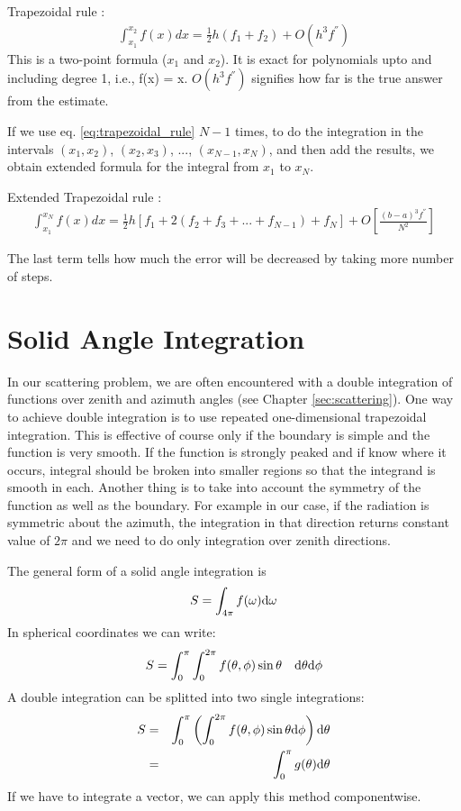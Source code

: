 Trapezoidal rule : 
\begin{eqnarray}
\label{eq:trapezoidal_rule}
{\int_{x_1}^{x_2} f(x)dx}  = \frac{1}{2} h (f_1 + f_2) + O(h^3 f^{''})
\end{eqnarray}
This is a two-point formula ($x_1$ and $x_2$).  It is exact for
polynomials upto and including degree 1, i.e., f(x) = x. $O(h^3
f^{''})$ signifies how far is the true answer from the estimate. 

If we use eq. \ref{eq:trapezoidal_rule} $N - 1$ times, to do the
integration in the intervals $(x_1, x_2)$,  $(x_2, x_3)$, ...,
$(x_{N-1}, x_N)$, and then add the results, we obtain extended formula
for the integral from $x_1$ to $x_N$.

Extended Trapezoidal rule :
\begin{eqnarray}
\label{eq:ext_trapezoidal_rule}
{\int_{x_1}^{x_N} f(x)dx}  = \frac{1}{2} h \left [f_1 + 2(f_2 + f_3 +
... +f_{N-1})+f_N \right] + O\left [ \frac {(b-a)^3 f^{''}}{N^2} \right]
\end{eqnarray}

The last term tells how much the error will be decreased by taking
more number of steps. 

\section{Solid Angle Integration}
\label{sec:integration:solid_angle}
In our scattering problem, we are often encountered with a double integration
of functions over zenith and azimuth angles (see Chapter
\ref{sec:scattering}).  One way to achieve
double integration is to use repeated
one-dimensional trapezoidal integration.  This is effective of course
only if the boundary is simple and the function is very smooth.  If
the function is strongly peaked and if know where it occurs, integral
should be broken into smaller regions so that the 
integrand is smooth in each.  Another thing is to take into account
the symmetry of the function as well as the boundary. For example in
our case, if the radiation is symmetric about the azimuth, the
integration in that direction returns constant value of $2 \pi$ and we
need to do only integration over zenith directions.  

The general form of a solid angle integration is
\begin{equation}
  \label{eq:solid_int}
S = \int_{4\pi} f(\omega) \mathrm{d}\omega
\end{equation}
In spherical coordinates we can write:
\begin{equation}
  \label{eq:sol_int_sph}
 S = \int_0^\pi \int_0^{2\pi} f(\theta,\phi) \sin\theta \quad\mathrm{d}\theta\mathrm{d}\phi
\end{equation}
A double integration can be splitted into two single integrations:
\begin{eqnarray}
 S &=& \int_0^\pi \left(\int_0^{2\pi}  f(\theta,\phi) \sin\theta \mathrm{d}\phi \right) \mathrm{d}\theta \\
 &=& \int_0^\pi g(\theta) \mathrm{d}\theta
\end{eqnarray}
If we have to integrate a vector, we can apply this method componentwise.

